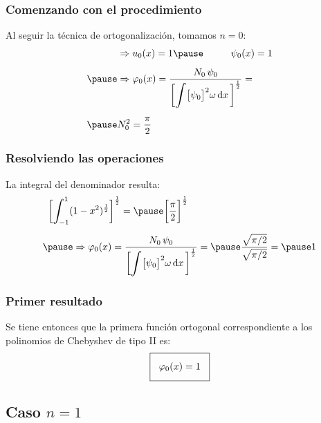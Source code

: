 \documentclass[12pt]{beamer}
\begin{document}
\begin{frame}
\frametitle{Comenzando con el procedimiento}
Al seguir la técnica de ortogonalización, \pause tomamos $n = 0$:
\pause
\begin{eqnarray*}
\begin{aligned}
&\Rightarrow u_{0} (x) = 1 \pause \hspace{1cm} \psi_{0}(x) =  1 \\[0.5em] \pause
&\Rightarrow \varphi_{0}(x) = \dfrac{N_{0} \, \psi_{0}}{\bigg[ \scaleint{6ex} \big[ \psi_{0} \big]^{2} \omega \dd{x} \bigg]^{\frac{1}{2}}} = \\[0.5em] \pause
&N_{0}^{2} = \dfrac{\pi}{2}
\end{aligned}
\end{eqnarray*}
\end{frame}
\begin{frame}
\frametitle{Resolviendo las operaciones}
La integral del denominador resulta:
\pause
\begin{eqnarray*}
\begin{aligned}
\bigg[ \scaleint{6ex}_{\bs -1}^{1} (&1 - x^{2})^{\frac{1}{2}} \bigg]^{\frac{1}{2}} = \pause \bigg[ \dfrac{\pi}{2} \bigg]^{\frac{1}{2}} \\[0.5em] \pause
&\Rightarrow \varphi_{0}(x) = \dfrac{N_{0} \, \psi_{0}}{\bigg[ \scaleint{6ex} \big[ \psi_{0} \big]^{2} \omega \dd{x} \bigg]^{\frac{1}{2}}} = \pause \dfrac{\sqrt{\pi/2}}{\sqrt{\pi/2}} = \pause 1
\end{aligned}
\end{eqnarray*}
\end{frame}
\begin{frame}
\frametitle{Primer resultado}
Se tiene entonces que la primera función ortogonal correspondiente a los polinomios de Chebyshev de tipo II es:
\pause
\begin{align*}
\setlength{\fboxsep}{3\fboxsep}\boxed{
\varphi_{0} (x) = 1}
\end{align*}
\end{frame}

\subsection{Caso \texorpdfstring{$n=1$}{n=1}}
\end{document}
